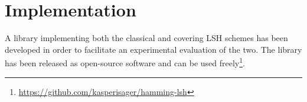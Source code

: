 \section{Implementation}
\label{implementation}

A library implementing both the classical and covering LSH schemes has been developed in order to facilitate an experimental evaluation of the two. The library has been released as open-source software and can be used freely\footnote{\url{https://github.com/kasperisager/hamming-lsh}}.
